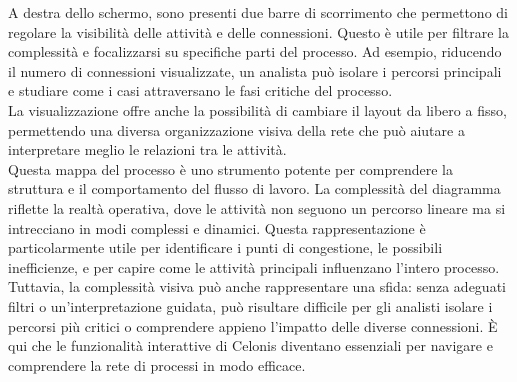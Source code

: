 \documentclass{article}
\begin{document}
A destra dello schermo, sono presenti due barre di scorrimento che permettono di regolare la visibilità delle attività e delle connessioni. Questo è utile per filtrare la complessità e focalizzarsi su specifiche parti del processo. Ad esempio, riducendo il numero di connessioni visualizzate, un analista può isolare i percorsi principali e studiare come i casi attraversano le fasi critiche del processo.\\
La visualizzazione offre anche la possibilità di cambiare il layout da libero a fisso, permettendo una diversa organizzazione visiva della rete che può aiutare a interpretare meglio le relazioni tra le attività.\\
Questa mappa del processo è uno strumento potente per comprendere la struttura e il comportamento del flusso di lavoro. La complessità del diagramma riflette la realtà operativa, dove le attività non seguono un percorso lineare ma si intrecciano in modi complessi e dinamici. Questa rappresentazione è particolarmente utile per identificare i punti di congestione, le possibili inefficienze, e per capire come le attività principali influenzano l'intero processo.\\
Tuttavia, la complessità visiva può anche rappresentare una sfida: senza adeguati filtri o un'interpretazione guidata, può risultare difficile per gli analisti isolare i percorsi più critici o comprendere appieno l'impatto delle diverse connessioni. È qui che le funzionalità interattive di Celonis diventano essenziali per navigare e comprendere la rete di processi in modo efficace.
\end{document}
